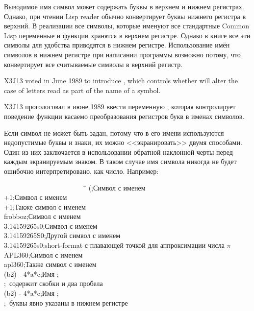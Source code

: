 Выводимое имя символ может содержать буквы в верхнем и нижнем регистрах.
Однако, при чтении Lisp reader обычно конвертирует буквы нижнего регистра в
верхний.
В реализации все символы, которые именуют все стандартные Common Lisp переменные
и функции хранятся в верхнем регистре. Однако в книге все эти символы для
удобства приводятся в нижнем регистре. Использование имён символов в нижнем
регистре при написании программы возможно потому, что  конвертирует все
считываемые символы в верхний регистр.

\begin{newer}
X3J13 voted in June 1989  to introduce
, which controls whether  will alter the case
of letters read as part of the name of a symbol.

X3J13 проголосовал в июне 1989 ввести 
переменную , которая контролирует поведение функции 
касаемо преобразования регистров букв в именах символов.
\end{newer}

Если символ не может быть задан, потому что в его имени используются
недопустимые буквы и знаки, их можно <<экранировать>> двумя способами. Один из
них заключается в использовании обратной наклонной черты перед каждым
экранируемым знаком. В таком случае имя символа никогда не будет ошибочно
интерпретировано, как число.
Например:
\begin{lisp}
~~~~~~~~~~~~~~~~~~~~~~~~\=\kill
{\Xbackslash}(\>;\textrm{Символ с именем \cd{(}} \\
{\Xbackslash}+1\>;\textrm{Символ с именем } \\
+{\Xbackslash}1\>;\textrm{Также символ с именем } \\
{\Xbackslash}frobboz\>;\textrm{Символ с именем } \\
3.14159265{\Xbackslash}s0\>;\textrm{Символ с именем } \\
3.14159265{\Xbackslash}S0\>;\textrm{Другой символ с именем } \\
3.14159265s0\>;\textrm{short-format с плавающей точкой для аппроксимации числа $\pi$} \\
APL{\Xbackslash}{\Xbackslash}360\>;\textrm{Символ с именем } \\
apl{\Xbackslash}{\Xbackslash}360\>;\textrm{Также символ с именем } \\
{\Xbackslash}(b{\Xcircumflex}2{\Xbackslash}){\Xbackslash} -{\Xbackslash} 4*a*c\>;\textrm{Имя ;} \\
\>;~\textrm{содержит скобки и два пробела} \\
{\Xbackslash}({\Xbackslash}b{\Xcircumflex}2{\Xbackslash}){\Xbackslash} -{\Xbackslash} 4*{\Xbackslash}a*{\Xbackslash}c\>;\textrm{Имя ;} \\
\>;~\textrm{буквы явно указаны в нижнем регистре}
\end{lisp}

